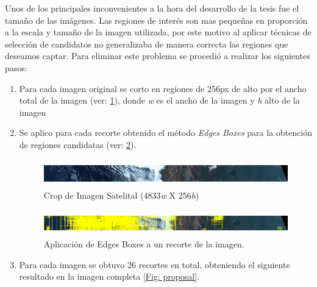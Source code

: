 Unos de los principales inconvenientes a la hora del desarrollo de la tesis fue el tamaño de las imágenes. Las regiones de interés son mas pequeñas en proporción a la escala y tamaño de la imagen utilizada, por este motivo al aplicar técnicas de selección de candidatos no generalizaba de manera correcta las regiones que deseamos captar. Para eliminar este problema se procedió a realizar los siguientes pasos: 
\begin{enumerate}
 \item Para cada imagen original se corto en regiones de 256px de alto por el ancho total de la imagen (ver: \ref{Fig: cropimagen}), donde \textit{w} es el ancho de la imagen y \textit{h} alto de la imagen
 \item Se aplico para cada recorte obtenido el método \textit{Edges Boxes} para la obtención de regiones candidatas (ver: \ref{Fig: cropproposal}).

\begin{figure}[H]
 \centering
  \includegraphics[height=1.2cm,keepaspectratio=true,clip=true]{imagenes/Logos/cropimagen.png}
  \caption{Crop de Imagen Satelital (4833\textit{w} X 256\textit{h})}
	\label{Fig: cropimagen}
\end{figure}

\begin{figure}[H]
 \centering
  \includegraphics[height=1.1cm,keepaspectratio=true,clip=true]{imagenes/Logos/cropproposal.png}
  \caption{Aplicación de Edges Boxes a un recorte de la imagen.}
	\label{Fig: cropproposal}
\end{figure}

\item Para cada imagen se obtuvo 26 recortes en total, obteniendo el siguiente resultado en la imagen completa \ref{Fig: proposal}.


\end{enumerate}
